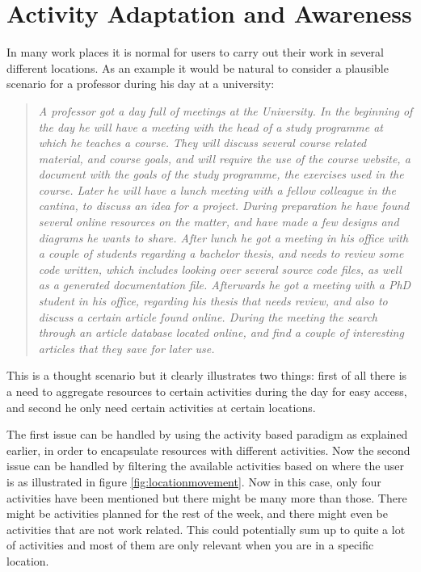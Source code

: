 \section{Activity Adaptation and Awareness}
In many work places it is normal for users to carry out their work in several different locations. As an example it would be natural to consider a plausible scenario for a professor during his day at a university:

\begin{quotation}
\emph{
A professor got a day full of meetings at the University. In the beginning of the day he will have a meeting with the head of a study programme at which he teaches a course. They will discuss several course related material, and course goals, and will require the use of the course website, a document with the goals of the study programme, the exercises used in the course. Later he will have a lunch meeting with a fellow colleague in the cantina, to discuss an idea for a project. During preparation he have found several online resources on the matter, and have made a few designs and diagrams he wants to share. After lunch he got a meeting in his office with a couple of students regarding a bachelor thesis, and needs to review some code written, which includes looking over several source code files, as well as a generated documentation file. Afterwards he got a meeting with a PhD student in his office, regarding his thesis that needs review, and also to discuss a certain article found online. During the meeting the search through an article database located online, and find a couple of interesting articles that they save for later use.
}
\end{quotation}

This is a thought scenario but it clearly illustrates two things: first of all there is a need to aggregate resources to certain activities during the day for easy access, and second he only need certain activities at certain locations.

The first issue can be handled by using the activity based paradigm as explained earlier, in order to encapsulate resources with different activities. Now the second issue can be handled by filtering the available activities based on where the user is as illustrated in figure \ref{fig:locationmovement}. Now in this case, only four activities have been mentioned but there might be many more than those. There might be activities planned for the rest of the week, and there might even be activities that are not work related. This could potentially sum up to quite a lot of activities and most of them are only relevant when you are in a specific location.

